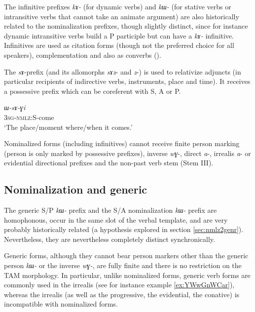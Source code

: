 \documentclass[oneside,a4paper,11pt]{article}
\newcommand{\ipa}[1]{\textit{\phon\mbox{#1}}} %
\begin{document}
The infinitive prefixes  \ipa{kɤ-} (for dynamic verbs) and \ipa{kɯ-} (for stative verbs or intransitive verbs that cannot take an animate argument) are also historically related to the nominalization prefixes, though slightly distinct, since for instance dynamic intransitive verbs build a P participle but can have a \ipa{kɤ-} infinitive. Infinitives are used as citation forms (though not the preferred choice for all speakers), complementation and also as converbs (\citealt{jacques14linking}).
 
 The \ipa{sɤ}-prefix (and its allomorphs \ipa{sɤz}- and \ipa{z}-) is used to relativize adjuncts (in particular recipients of indirective verbs, instruments, place and time).  It receives a possessive prefix  which can be coreferent with S, A or P.

   \begin{exe}
\ex \label{ex:come}
\gll \ipa{ɯ-sɤ-ɣi}    \\
   \textsc{3sg-nmlz}:S-come \\
 \glt  `The place/moment where/when it comes.'
 \end{exe}

Nominalized forms (including infinitives) cannot receive finite person marking (person is only marked by possessive prefixes), inverse \ipa{wɣ}-, direct \ipa{a}-, irrealis \ipa{a}- or evidential directional prefixes and the non-past verb stem (Stem III).
 
 

 \subsection{Nominalization and generic}  
The generic S/P \ipa{kɯ-} prefix and the S/A nominalization \ipa{kɯ-} prefix are homophonous, occur in the same slot of the verbal template, and are very probably historically related (a hypothesis explored in section \ref{sec:nmlz2genr}). Nevertheless, they are nevertheless completely distinct synchronically. 

Generic forms, although they cannot bear person markers other than the generic  person \ipa{kɯ-} or the inverse \ipa{wɣ-}, are fully finite and there is no restriction on the TAM morphology. In particular, unlike nominalized forms, generic verb forms are commonly used in the irrealis (see for instance example \ref{ex:YWwGnWCar}), whereas the irrealis (as well as the progressive, the evidential, the conative) is incompatible with  nominalized forms.
\end{document}
